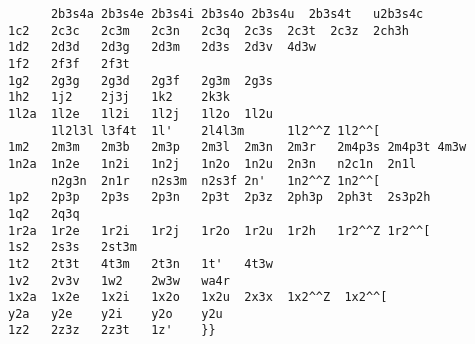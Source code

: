 \documentclass{ltugboat}
\begin{document}
\begin{verbatim}
      2b3s4a 2b3s4e 2b3s4i 2b3s4o 2b3s4u  2b3s4t   u2b3s4c
1c2   2c3c   2c3m   2c3n   2c3q  2c3s  2c3t  2c3z  2ch3h
1d2   2d3d   2d3g   2d3m   2d3s  2d3v  4d3w
1f2   2f3f   2f3t
1g2   2g3g   2g3d   2g3f   2g3m  2g3s
1h2   1j2    2j3j   1k2    2k3k
1l2a  1l2e   1l2i   1l2j   1l2o  1l2u
      1l2l3l l3f4t  1l'    2l4l3m      1l2^^Z 1l2^^[
1m2   2m3m   2m3b   2m3p   2m3l  2m3n  2m3r   2m4p3s 2m4p3t 4m3w
1n2a  1n2e   1n2i   1n2j   1n2o  1n2u  2n3n   n2c1n  2n1l
      n2g3n  2n1r   n2s3m  n2s3f 2n'   1n2^^Z 1n2^^[
1p2   2p3p   2p3s   2p3n   2p3t  2p3z  2ph3p  2ph3t  2s3p2h
1q2   2q3q
1r2a  1r2e   1r2i   1r2j   1r2o  1r2u  1r2h   1r2^^Z 1r2^^[
1s2   2s3s   2st3m
1t2   2t3t   4t3m   2t3n   1t'   4t3w
1v2   2v3v   1w2    2w3w   wa4r
1x2a  1x2e   1x2i   1x2o   1x2u  2x3x  1x2^^Z  1x2^^[
y2a   y2e    y2i    y2o    y2u
1z2   2z3z   2z3t   1z'    }}
\end{verbatim}
\end{document}
